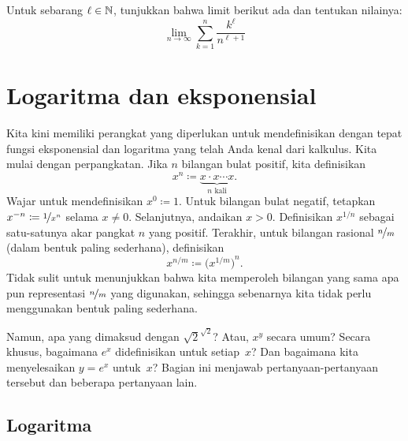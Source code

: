 \begin{exercise}
Untuk sebarang $\ell \in {\mathbb{N}}$,
tunjukkan bahwa limit berikut ada dan tentukan nilainya:
\begin{equation*}
\lim_{n\to\infty} \sum_{k=1}^n \frac{k^\ell}{n^{\ell+1}}
\end{equation*}
\end{exercise}


\sectionnewpage
\section{Logaritma dan eksponensial}
\label{sec:logandexp}



Kita kini memiliki perangkat yang diperlukan untuk mendefinisikan dengan tepat fungsi eksponensial
dan
logaritma yang telah Anda kenal dari kalkulus.  Kita mulai dengan
perpangkatan.
Jika $n$ bilangan bulat positif, kita definisikan
\begin{equation*}
x^n \coloneqq \underbrace{x \cdot x \cdots x}_{n \text{ kali}} .
\end{equation*}
Wajar untuk mendefinisikan $x^0 \coloneqq 1$.
Untuk bilangan bulat negatif, tetapkan $x^{-n} \coloneqq \nicefrac{1}{x^n}$ selama
$x \neq 0$.
Selanjutnya, andaikan $x > 0$.
Definisikan
$x^{1/n}$ sebagai
satu-satunya akar pangkat $n$ yang positif.  Terakhir, untuk bilangan
rasional $\nicefrac{n}{m}$ (dalam bentuk paling sederhana), definisikan
\begin{equation*}
x^{n/m} \coloneqq {\bigl(x^{1/m}\bigr)}^n .
\end{equation*}
Tidak sulit untuk menunjukkan bahwa
kita memperoleh bilangan yang sama apa pun
representasi $\nicefrac{n}{m}$ yang digunakan, sehingga sebenarnya kita tidak perlu menggunakan
bentuk paling sederhana.

Namun, apa yang dimaksud dengan $\sqrt{2}^{\sqrt{2}}$?  Atau,
$x^y$ secara umum?  Secara khusus, bagaimana $e^x$ didefinisikan untuk setiap~$x$?
Dan bagaimana kita menyelesaikan $y=e^x$ untuk~$x$?
Bagian ini menjawab pertanyaan-pertanyaan tersebut dan beberapa pertanyaan lain.

\subsection{Logaritma}

